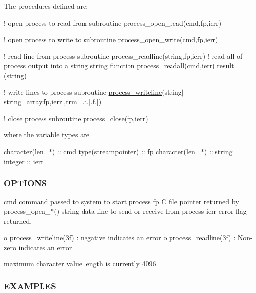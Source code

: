 The procedures defined are\+:

! open process to read from subroutine process\+\_\+open\+\_\+read(cmd,fp,ierr)

! open process to write to subroutine process\+\_\+open\+\_\+write(cmd,fp,ierr)

! read line from process subroutine process\+\_\+readline(string,fp,ierr) ! read all of process output into a string string function process\+\_\+readall(cmd,ierr) result (string)

! write lines to process subroutine \mbox{\hyperlink{interfacem__process_1_1process__writeline}{process\+\_\+writeline}}(string$\vert$string\+\_\+array,fp,ierr\mbox{[},trm=.t.$\vert$.f.\mbox{]})

! close process subroutine process\+\_\+close(fp,ierr)

where the variable types are

character(len=$\ast$) \+:\+: cmd type(streampointer) \+:\+: fp character(len=$\ast$) \+:\+: string integer \+:\+: ierr

\subsubsection*{O\+P\+T\+I\+O\+NS}

\begin{DoxyVerb}cmd      command passed to system to start process
fp       C file pointer returned by process_open_*()
string   data line to send or receive from process
ierr     error flag returned.

          o process_writeline(3f) : negative indicates an error
          o process_readline(3f)  : Non-zero indicates an error

maximum character value length is currently 4096
\end{DoxyVerb}


\subsubsection*{E\+X\+A\+M\+P\+L\+ES}

